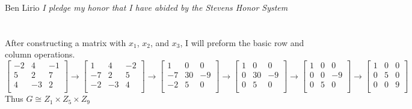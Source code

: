 \documentclass{article}
\begin{document}
Ben Lirio
\textit{I pledge my honor that I have abided by the Stevens Honor System}

\section{}

After constructing a matrix with $x_1$, $x_2$, and $x_3$,
I will preform the basic row and column operations.
\[
\begin{bmatrix}
-2 & 4 & -1 \\
5 & 2 & 7 \\
4 & -3 & 2 \\
\end{bmatrix}
\rightarrow
\begin{bmatrix}
1 & 4 &  -2\\
-7 & 2 & 5 \\
-2 & -3 & 4 \\
\end{bmatrix}
\rightarrow
\begin{bmatrix}
1  & 0  & 0 \\
-7 & 30  & -9 \\
-2 & 5 & 0 \\
\end{bmatrix}
\rightarrow
\begin{bmatrix}
1  & 0  & 0 \\
0 & 30  & -9 \\
0 & 5 & 0 \\
\end{bmatrix}
\rightarrow
\begin{bmatrix}
1  & 0  & 0 \\
0 & 0  & -9 \\
0 & 5 & 0 \\
\end{bmatrix}
\rightarrow
\begin{bmatrix}
1  & 0  & 0 \\
0 & 5  & 0 \\
0 & 0 & 9 \\
\end{bmatrix}
\]
Thus $G \cong Z_{1} \times Z_{5} \times Z_{9} $

\end{document}
